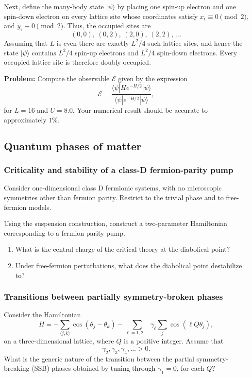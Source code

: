 Next, define the many-body state \(|\psi\rangle\) by placing one spin-up
electron and one spin-down electron on every lattice site whose coordinates
satisfy \(x_i \equiv 0 \pmod{2}\), and \(y_i \equiv 0 \pmod{2}\). Thus, the
occupied sites are
\[
(0,0),\ (0,2),\ (2,0),\ (2,2),\ \ldots
\]
Assuming that \(L\) is even there are exactly \(L^2/4\) such lattice sites, and
hence the state \(|\psi\rangle\) contains \(L^2/4\) spin-up electrons and
\(L^2/4\) spin-down electrons. Every occupied lattice site is therefore doubly
occupied.

\textbf{Problem:} Compute the observable \(\mathcal{E}\) given by the expression
\begin{equation}
\mathcal{E}
=
\frac{
\langle \psi| H e^{-H/2} |\psi\rangle
}{
\langle \psi| e^{-H/2} |\psi\rangle
},
\tag{16}
\end{equation}
for \(L=16\) and \(U=8.0\). Your numerical result should be accurate to     
approximately \(1\%\).

\subsection{Quantum phases of matter}
\label{problems:quantum-matter}

\subsubsection{Criticality and stability of a class-D fermion-parity pump}
\label{problem:fermion-parity-pump}
Consider one-dimensional class D fermionic systems, with no microscopic symmetries other than fermion parity. Restrict to the trivial phase and to free-fermion models.

Using the suspension construction, construct a two-parameter Hamiltonian corresponding to a fermion parity pump.

\begin{enumerate}
    \item[(a)] What is the central charge of the critical theory at the diabolical point?
    \item[(b)] Under free-fermion perturbations, what does the diabolical point destabilize to?
\end{enumerate}


\subsubsection{Transitions between partially symmetry-broken phases}
\label{problem:partial-symmetry-breaking}
Consider the Hamiltonian
\[
H
=
-\sum_{\langle j,k\rangle}\cos(\theta_j-\theta_k)
-\sum_{\ell=1,2,\ldots}\gamma_\ell\sum_j\cos(\ell Q\theta_j),
\]
on a three-dimensional lattice, where \(Q\) is a positive integer. Assume that
\[
\gamma_2,\gamma_3,\gamma_4,\ldots>0.
\]
What is the generic nature of the transition between the partial symmetry-breaking (SSB) phases obtained by tuning through \(\gamma_1=0\), for each \(Q\)?


